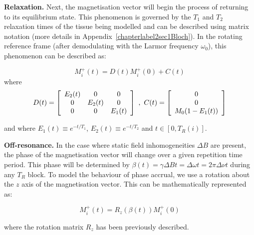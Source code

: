 \hfill

\textbf{Relaxation.} 
Next, the magnetisation vector will begin the process of returning to its equilibrium state.
This phenomenon is governed by the $T_1$ and $T_2$ relaxation times of the tissue being modelled and can be described using matrix notation (more details in Appendix~\ref{chapterlabel2sec1Bloch}).
In the rotating reference frame (after demodulating with the Larmor frequency $\omega_0$), this phenomenon can be described as:

\begin{equation}
    M^{+}_i (t)  = D(t) M^{+}_i (0) + C(t)
\end{equation}
where
\begin{equation}
    D ( t ) = \left[
    \begin{array}{c c c}
          E_2(t) &     0      &     0 \\
          0      & E_2(t) &     0 \\
          0      &     0      & E_1(t)
    \end{array}
    \right] \, \, \text{,  } \, 
    C ( t ) = \left[
    \begin{array}{c}
        0 \\
        0 \\
    M_0(1 - E_1(t))
    \end{array}
    \right]
\end{equation}

and where $E_1(t) \equiv e^{-t/T_1}$, $E_2(t) \equiv e^{-t/T_2}$ and
$t \in [0, T_R(i)]$.

\hfill

\textbf{Off-resonance.} 
In the case where static field inhomogeneities $\Delta B$ are present, the phase of the magnetisation vector will change over a given repetition time period. 
This phase will be determined by $\beta(t) = \gamma \Delta B t = \Delta \omega t = 2\pi \Delta \nu t$ during any $T_R$ block.
To model the behaviour of phase accrual, we use a rotation about the $z$ axis of the magnetisation vector.
This can be mathematically represented as:

\begin{equation}
    M^{+}_i (t)  = R_z(\beta(t)) M^{+}_i (0)
\end{equation}

where the rotation matrix $R_z$ has been previously described.

